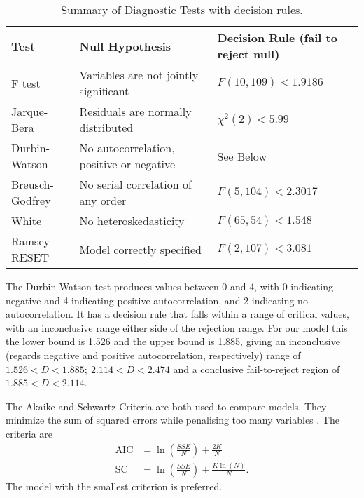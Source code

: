 \documentclass[12pt]{article}
\begin{document}
\begin{table}[!htb]\caption{\label{tb:testsum} Summary of Diagnostic Tests with decision rules.}
\begin{tabular}{lll}
\textbf{Test}            & \textbf{Null Hypothesis}                          & \textbf{Decision Rule} (fail to reject null) \\\hline
F test          & Variables are not jointly significant    & \(F(10,109) < 1.9186 \)         \\
Jarque-Bera     & Residuals are normally distributed       & \(\chi^2(2) < 5.99\)                 \\
Durbin-Watson   & No autocorrelation, positive or negative & See Below                           \\
Breusch-Godfrey & No serial correlation of any order       & \(F(5, 104) < 2.3017 \)             \\
White           & No heteroskedasticity                    & \(F(65,54) < 1.548\) \\
Ramsey RESET    & Model correctly specified                & \(F(2,107)< 3.081\)        
\end{tabular}
\end{table}
The Durbin-Watson test produces values between 0 and 4, with 0 indicating negative and 4 indicating positive autocorrelation, and 2 indicating no autocorrelation. It has a decision rule that falls within a range of critical values, with an inconclusive range either side of the rejection range. For our model this the lower bound is 1.526 and the upper bound is 1.885, giving an inconclusive (regards negative and positive autocorrelation, respectively) range of \(1.526 < D < 1.885; \: 2.114 < D < 2.474\) and a conclusive fail-to-reject region of \(1.885 < D < 2.114\).  

The Akaike and Schwartz Criteria are both used to compare models. They minimize the sum of squared errors while penalising too many variables \parencite[238]{hillPrinciplesEconometrics2011}. The criteria are 
\begin{align*}
\textrm{AIC} &= \ln \left(\frac{SSE}{N}\right) + \frac{2K}{N} \\
\textrm{SC} &= \ln \left(\frac{SSE}{N}\right) + \frac{K\ln (N)}{N}.
\end{align*}
The model with the smallest criterion is preferred.
\end{document}
